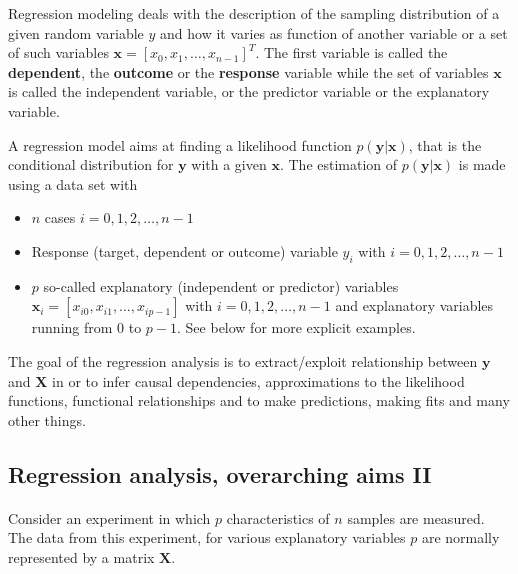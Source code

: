 \documentclass[%
oneside,                 %
final,                   %
10pt]{article}
\begin{document}
Regression modeling deals with the description of  the sampling distribution of a given random variable $y$ and how it varies as function of another variable or a set of such variables $\bm{x} =[x_0, x_1,\dots, x_{n-1}]^T$. 
The first variable is called the \textbf{dependent}, the \textbf{outcome} or the \textbf{response} variable while the set of variables $\bm{x}$ is called the independent variable, or the predictor variable or the explanatory variable. 

A regression model aims at finding a likelihood function $p(\bm{y}\vert \bm{x})$, that is the conditional distribution for $\bm{y}$ with a given $\bm{x}$. The estimation of  $p(\bm{y}\vert \bm{x})$ is made using a data set with 
\begin{itemize}
\item $n$ cases $i = 0, 1, 2, \dots, n-1$ 

\item Response (target, dependent or outcome) variable $y_i$ with $i = 0, 1, 2, \dots, n-1$ 

\item $p$ so-called explanatory (independent or predictor) variables $\bm{x}_i=[x_{i0}, x_{i1}, \dots, x_{ip-1}]$ with $i = 0, 1, 2, \dots, n-1$ and explanatory variables running from $0$ to $p-1$. See below for more explicit examples.   
\end{itemize}

\noindent
 The goal of the regression analysis is to extract/exploit relationship between $\bm{y}$ and $\bm{X}$ in or to infer causal dependencies, approximations to the likelihood functions, functional relationships and to make predictions, making fits and many other things.



\subsection*{Regression analysis, overarching aims II}

\paragraph{}


Consider an experiment in which $p$ characteristics of $n$ samples are
measured. The data from this experiment, for various explanatory variables $p$ are normally represented by a matrix  
$\mathbf{X}$.
\end{document}

